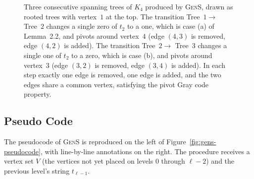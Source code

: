 \documentclass{article}
\begin{document}
\begin{figure}[H]
  \caption{Three consecutive spanning trees of $K_4$ produced by \textsc{GenS}, drawn as rooted trees with vertex~$1$ at the top. The transition Tree~$1 \to$ Tree~$2$ changes a single zero of $t_2$ to a one, which is case (a) of Lemma~2.2, and pivots around vertex~$4$ (edge $(4,3)$ is removed, edge $(4,2)$ is added). The transition Tree~$2 \to$ Tree~$3$ changes a single one of $t_2$ to a zero, which is case (b), and pivots around vertex~$3$ (edge $(3,2)$ is removed, edge $(3,4)$ is added). In each step exactly one edge is removed, one edge is added, and the two edges share a common vertex, satisfying the pivot Gray code property.}
  \label{fig:gens-iteration}
\end{figure}

\subsection{Pseudo Code}

The pseudocode of \textsc{GenS} is reproduced on the left of Figure~\ref{fig:gens-pseudocode}, with line-by-line annotations on the right. The procedure receives a vertex set $V$ (the vertices not yet placed on levels $0$ through $\ell-2$) and the previous level's string $t_{\ell-1}$.
\end{document}
